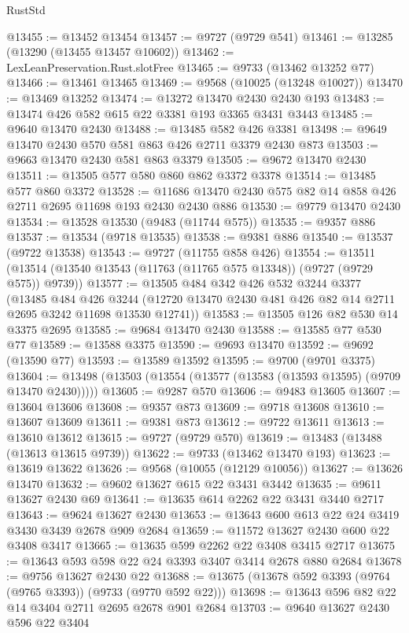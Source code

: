 \begin{lexlean}{RustStd}
\begin{coremodule}
@13455 := @13452 @13454
@13457 := @9727 (@9729 @541)
@13461 := @13285 (@13290 (@13455 @13457 @10602))
@13462 := LexLeanPreservation.Rust.slotFree
@13465 := @9733 (@13462 @13252 @77)
@13466 := @13461 @13465
@13469 := @9568 (@10025 (@13248 @10027))
@13470 := @13469 @13252
@13474 := @13272 @13470 @2430 @2430 @193
@13483 := @13474 @426 @582 @615 @22 @3381 @193 @3365 @3431 @3443
@13485 := @9640 @13470 @2430
@13488 := @13485 @582 @426 @3381
@13498 := @9649 @13470 @2430 @570 @581 @863 @426 @2711 @3379 @2430 @873
@13503 := @9663 @13470 @2430 @581 @863 @3379
@13505 := @9672 @13470 @2430
@13511 := @13505 @577 @580 @860 @862 @3372 @3378
@13514 := @13485 @577 @860 @3372
@13528 := @11686 @13470 @2430 @575 @82 @14 @858 @426 @2711 @2695 @11698 @193 @2430 @2430 @886
@13530 := @9779 @13470 @2430
@13534 := @13528 @13530 (@9483 (@11744 @575))
@13535 := @9357 @886
@13537 := @13534 (@9718 @13535)
@13538 := @9381 @886
@13540 := @13537 (@9722 @13538)
@13543 := @9727 (@11755 @858 @426)
@13554 := @13511 (@13514 (@13540 @13543 (@11763 (@11765 @575 @13348)) (@9727 (@9729 @575)) @9739))
@13577 := @13505
    @484
    @342
    @426
    @532
    @3244
    @3377
    (@13485
      @484
      @426
      @3244
      (@12720 @13470 @2430 @481 @426 @82 @14 @2711 @2695 @3242 @11698 @13530 @12741))
@13583 := @13505 @126 @82 @530 @14 @3375 @2695
@13585 := @9684 @13470 @2430
@13588 := @13585 @77 @530 @77
@13589 := @13588 @3375
@13590 := @9693 @13470
@13592 := @9692 (@13590 @77)
@13593 := @13589 @13592
@13595 := @9700 (@9701 @3375)
@13604 := @13498 (@13503 (@13554 (@13577 (@13583 (@13593 @13595) (@9709 @13470 @2430)))))
@13605 := @9287 @570
@13606 := @9483 @13605
@13607 := @13604 @13606
@13608 := @9357 @873
@13609 := @9718 @13608
@13610 := @13607 @13609
@13611 := @9381 @873
@13612 := @9722 @13611
@13613 := @13610 @13612
@13615 := @9727 (@9729 @570)
@13619 := @13483 (@13488 (@13613 @13615 @9739))
@13622 := @9733 (@13462 @13470 @193)
@13623 := @13619 @13622
@13626 := @9568 (@10055 (@12129 @10056))
@13627 := @13626 @13470
@13632 := @9602 @13627 @615 @22 @3431 @3442
@13635 := @9611 @13627 @2430 @69
@13641 := @13635 @614 @2262 @22 @3431 @3440 @2717
@13643 := @9624 @13627 @2430
@13653 := @13643 @600 @613 @22 @24 @3419 @3430 @3439 @2678 @909 @2684
@13659 := @11572 @13627 @2430 @600 @22 @3408 @3417
@13665 := @13635 @599 @2262 @22 @3408 @3415 @2717
@13675 := @13643 @593 @598 @22 @24 @3393 @3407 @3414 @2678 @880 @2684
@13678 := @9756 @13627 @2430 @22
@13688 := @13675 (@13678 @592 @3393 (@9764 (@9765 @3393)) (@9733 (@9770 @592 @22)))
@13698 := @13643 @596 @82 @22 @14 @3404 @2711 @2695 @2678 @901 @2684
@13703 := @9640 @13627 @2430 @596 @22 @3404

\end{coremodule}
\end{lexlean}
